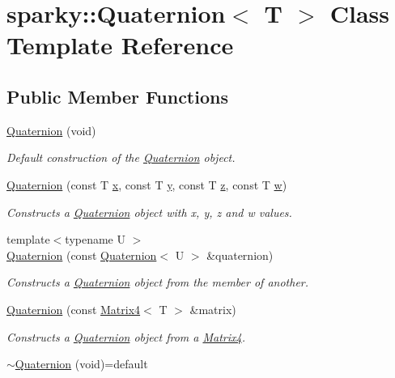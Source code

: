 \hypertarget{classsparky_1_1_quaternion}{}\section{sparky\+:\+:Quaternion$<$ T $>$ Class Template Reference}
\label{classsparky_1_1_quaternion}
\subsection*{Public Member Functions}
\begin{DoxyCompactItemize}
\item 
\hyperlink{classsparky_1_1_quaternion_ae513e8510c499e40b799c99cb43d1bd0}{Quaternion} (void)
\begin{DoxyCompactList}\small\item\em Default construction of the \hyperlink{classsparky_1_1_quaternion}{Quaternion} object. \end{DoxyCompactList}\item 
\hyperlink{classsparky_1_1_quaternion_a64d595e7c1605110e2dedc979ac2214c}{Quaternion} (const T \hyperlink{classsparky_1_1_quaternion_a7da54206cf4aee17b8a4f8f37fb5e933}{x}, const T \hyperlink{classsparky_1_1_quaternion_afad75ff6f17af570e1dc5282fed93fd2}{y}, const T \hyperlink{classsparky_1_1_quaternion_adb942fb7394e572a57d4ddb4cb50131a}{z}, const T \hyperlink{classsparky_1_1_quaternion_a6de3864be1208046ce06ae5b8d130e28}{w})
\begin{DoxyCompactList}\small\item\em Constructs a \hyperlink{classsparky_1_1_quaternion}{Quaternion} object with x, y, z and w values. \end{DoxyCompactList}\item 
{\footnotesize template$<$typename U $>$ }\\\hyperlink{classsparky_1_1_quaternion_a8bf8c41d87d565dbfb46cf03e36625c8}{Quaternion} (const \hyperlink{classsparky_1_1_quaternion}{Quaternion}$<$ U $>$ \&quaternion)
\begin{DoxyCompactList}\small\item\em Constructs a \hyperlink{classsparky_1_1_quaternion}{Quaternion} object from the member of another. \end{DoxyCompactList}\item 
\hyperlink{classsparky_1_1_quaternion_ad73ea0b909b4cba03b097f6b6c0ab6cb}{Quaternion} (const \hyperlink{classsparky_1_1_matrix4}{Matrix4}$<$ T $>$ \&matrix)
\begin{DoxyCompactList}\small\item\em Constructs a \hyperlink{classsparky_1_1_quaternion}{Quaternion} object from a \hyperlink{classsparky_1_1_matrix4}{Matrix4}. \end{DoxyCompactList}\item 
\hyperlink{classsparky_1_1_quaternion_a20e121fc0c18bd304de860a334cca2c3}{$\sim$\+Quaternion} (void)=default\hypertarget{classsparky_1_1_quaternion_a20e121fc0c18bd304de860a334cca2c3}{}\label{classsparky_1_1_quaternion_a20e121fc0c18bd304de860a334cca2c3}


\end{DoxyCompactItemize}
